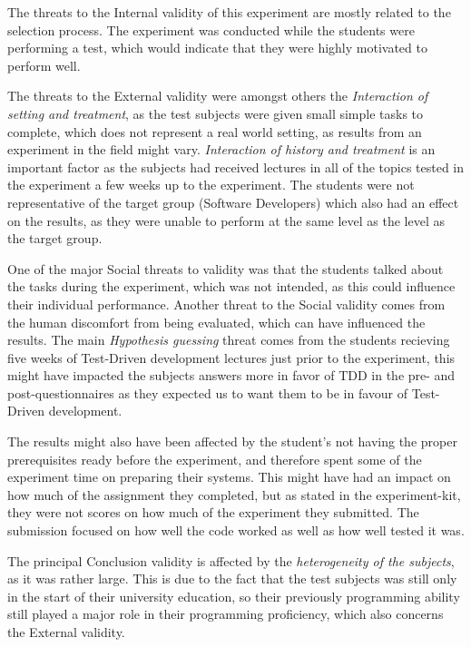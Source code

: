\documentclass{sig-alternate-05-2015}
\begin{document}
The threats to the Internal validity of this experiment are mostly related to the selection process. The experiment was conducted while the students were performing a test, which would indicate that they were highly motivated to perform well.

The threats to the External validity were amongst others the \textit{Interaction of setting and treatment}, as the test subjects were given small simple tasks to complete, which does not represent a real world setting, as results from an experiment in the field might vary. \textit{Interaction of history and treatment} is an important factor as the subjects had received lectures in all of the topics tested in the experiment a few weeks up to the experiment. The students were not representative of the target group (Software Developers) which also had an effect on the results, as they were unable to perform at the same level as the level as the target group.

One of the major Social threats to validity was that the students talked about the tasks during the experiment, which was not intended, as this could influence their individual performance. Another threat to the Social validity comes from the human discomfort from being evaluated\cite{henchy1}, which can have influenced the results. The main \textit{Hypothesis guessing} threat comes from the students recieving five  weeks of Test-Driven development lectures just prior to the experiment, this might have impacted the subjects answers more in favor of TDD in the pre- and post-questionnaires as they expected us to want them to be in favour of Test-Driven development. 

The results might also have been affected by the student's not having the proper prerequisites ready before the experiment, and therefore spent some of the experiment time on preparing their systems. This might have had an impact on how much of the assignment they completed, but as stated in the experiment-kit, they were not scores on how much of the experiment they submitted. The submission focused on how well the code worked as well as how well tested it was.

The principal Conclusion validity is affected by the \textit{heterogeneity of the subjects}, as it was rather large. This is due to the fact that the test subjects was still only in the start of their university education, so their previously programming ability still played a major role in their programming proficiency, which also concerns the External validity. 
\end{document}
